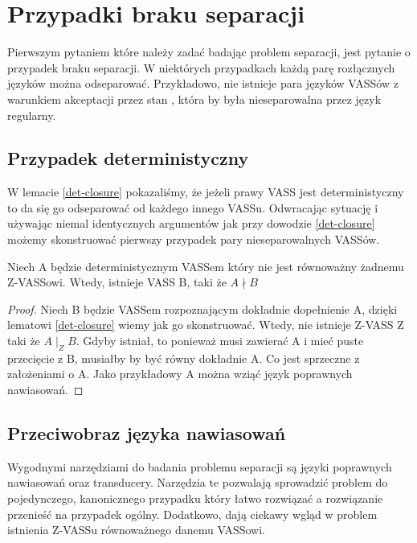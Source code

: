     \chapter{Przypadki braku separacji}

    Pierwszym pytaniem które należy zadać badając problem separacji, jest pytanie o przypadek braku separacji.
    W niektórych przypadkach każdą parę rozłącznych języków można odseparować.
    Przykładowo,  nie istnieje para języków VASSów z warunkiem akceptacji przez stan \cite{reach_sep},
    która by była nieseparowalna przez język regularny.


    \section{Przypadek deterministyczny}
    W lemacie \ref{det-closure} pokazaliśmy, że jeżeli prawy VASS jest deterministyczny to da się go odseparować od każdego innego VASSu.
    Odwracając sytuację i używając niemal identycznych argumentów jak przy dowodzie \ref{det-closure} możemy skonstruować pierwszy
    przypadek pary nieseparowalnych VASSów.

    \begin{lemma}
        Niech A będzie deterministycznym VASSem który nie jest równoważny żadnemu Z-VASSowi.
        Wtedy, istnieje VASS B, taki że $A \nmid B$


    \end{lemma}
    \begin{proof}
        Niech B będzie VASSem rozpoznającym dokładnie dopełnienie A, dzięki lematowi \ref{det-closure} wiemy jak go skonstruować.
        Wtedy, nie istnieje Z-VASS Z taki że $A \mid_Z B$.
        Gdyby istniał, to ponieważ musi zawierać A i mieć puste przecięcie z B, musiałby by być równy dokładnie A.
        Co jest sprzeczne z założeniami o A.
        Jako przykładowy A można wziąć język poprawnych nawiasowań.
    \end{proof}



    \section{Przeciwobraz języka nawiasowań}
    Wygodnymi narzędziami do badania problemu separacji są języki poprawnych nawiasowań oraz transducery.
    Narzędzia te pozwalają sprowadzić problem do pojedynczego, kanonicznego przypadku który łatwo rozwiązać a rozwiązanie
    przenieść na przypadek ogólny.
    Dodatkowo, dają ciekawy wgląd w problem istnienia Z-VASSu równoważnego danemu VASSowi.

